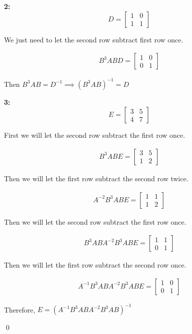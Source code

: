 \documentclass[11pt]{article}
\newenvironment{exercise}[1]
	{\noindent \textbf{#1:}}
	{\par \vspace{0.5\baselineskip}}
\begin{document}
\begin{exercise}{2}
	\[
		D=\begin{bmatrix}
			1 & 0 \\
			1 & 1
		\end{bmatrix}
	\]

	We just need to let the second row subtract first row once.

	\begin{align*}
		B^{3}ABD = \begin{bmatrix}
			1 & 0 \\
			0 & 1
		\end{bmatrix}
	\end{align*}

	Then \(B^3AB=D^{-1}\implies (B^3AB)^{-1}=D\)
\end{exercise}

\begin{exercise}{3}
	\[
	E=\begin{bmatrix}
		3 & 5 \\
		4 & 7
	\end{bmatrix}
	\]

	First we will let the second row subtract the first row once.

	\begin{align*}
		B^{3}ABE = \begin{bmatrix}
			3 & 5 \\
			1 & 2
		\end{bmatrix}
	\end{align*}

	Then we will let the first row subtract the second row twice.

	\begin{align*}
		A^{-2}B^{3}ABE = \begin{bmatrix}
			1 & 1 \\
			1 & 2
		\end{bmatrix}
	\end{align*}

	Then we will let the second row subtract the first row once.

	\begin{align*}
		B^{3}ABA^{-2}B^{3}ABE = \begin{bmatrix}
			1 & 1 \\
			0 & 1
		\end{bmatrix}
	\end{align*}

	Then we will let the first row subtract the second row once.

	\begin{align*}
		A^{-1}B^{3}ABA^{-2}B^{3}ABE = \begin{bmatrix}
			1 & 0 \\
			0 & 1
		\end{bmatrix}
	\end{align*}


	Therefore, \(E=(A^{-1}B^{3}ABA^{-2}B^{3}AB)^{-1}\)
\end{exercise}


\qed
\end{document}
